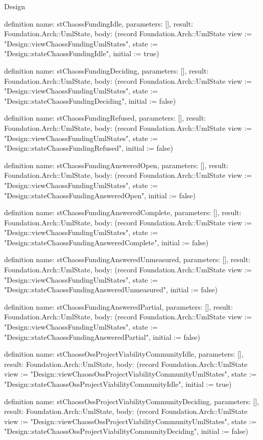 \begin{lexlean}{Design}
\begin{semanticmodule}
definition{
  name: stChaossFundingIdle,
  parameters: [],
  result: Foundation.Arch::UmlState,
  body: (record Foundation.Arch::UmlState {view := "Design::viewChaossFundingUmlStates", state := "Design::stateChaossFundingIdle", initial := true})
}

definition{
  name: stChaossFundingDeciding,
  parameters: [],
  result: Foundation.Arch::UmlState,
  body: (record Foundation.Arch::UmlState {view := "Design::viewChaossFundingUmlStates", state := "Design::stateChaossFundingDeciding", initial := false})
}

definition{
  name: stChaossFundingRefused,
  parameters: [],
  result: Foundation.Arch::UmlState,
  body: (record Foundation.Arch::UmlState {view := "Design::viewChaossFundingUmlStates", state := "Design::stateChaossFundingRefused", initial := false})
}

definition{
  name: stChaossFundingAnsweredOpen,
  parameters: [],
  result: Foundation.Arch::UmlState,
  body: (record Foundation.Arch::UmlState {view := "Design::viewChaossFundingUmlStates", state := "Design::stateChaossFundingAnsweredOpen", initial := false})
}

definition{
  name: stChaossFundingAnsweredComplete,
  parameters: [],
  result: Foundation.Arch::UmlState,
  body: (record Foundation.Arch::UmlState {view := "Design::viewChaossFundingUmlStates", state := "Design::stateChaossFundingAnsweredComplete", initial := false})
}

definition{
  name: stChaossFundingAnsweredUnmeasured,
  parameters: [],
  result: Foundation.Arch::UmlState,
  body: (record Foundation.Arch::UmlState {view := "Design::viewChaossFundingUmlStates", state := "Design::stateChaossFundingAnsweredUnmeasured", initial := false})
}

definition{
  name: stChaossFundingAnsweredPartial,
  parameters: [],
  result: Foundation.Arch::UmlState,
  body: (record Foundation.Arch::UmlState {view := "Design::viewChaossFundingUmlStates", state := "Design::stateChaossFundingAnsweredPartial", initial := false})
}

definition{
  name: stChaossOssProjectViabilityCommunityIdle,
  parameters: [],
  result: Foundation.Arch::UmlState,
  body: (record Foundation.Arch::UmlState {view := "Design::viewChaossOssProjectViabilityCommunityUmlStates", state := "Design::stateChaossOssProjectViabilityCommunityIdle", initial := true})
}

definition{
  name: stChaossOssProjectViabilityCommunityDeciding,
  parameters: [],
  result: Foundation.Arch::UmlState,
  body: (record Foundation.Arch::UmlState {view := "Design::viewChaossOssProjectViabilityCommunityUmlStates", state := "Design::stateChaossOssProjectViabilityCommunityDeciding", initial := false})
}


\end{semanticmodule}
\end{lexlean}
